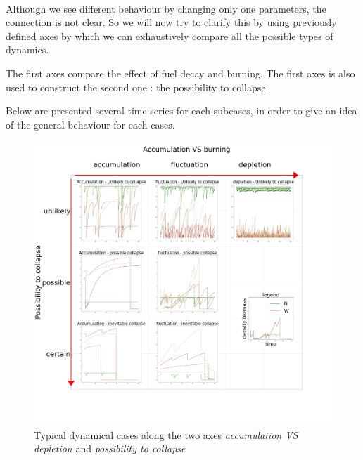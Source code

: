 \documentclass{article}
\begin{document}

\paragraph{}
Although we see different behaviour by changing only one parameters, the connection is not clear. So we will now try to clarify this by using \hyperref[axes_definition]{previously defined} axes by which we can exhaustively compare all the possible types of dynamics.
    
The first axes compare the effect of fuel decay and burning. The first axes is also used to construct the second one : the possibility to collapse.

Below are presented several time series for each subcases, in order to give an idea of the general behaviour for each cases.


\begin{figure}[h!]
\centering
\includegraphics[width=12cm]{results/time_series_each_cases.png}
\caption{Typical dynamical cases along the two axes \textit{accumulation VS depletion} and \textit{possibility to collapse}}
\end{figure}
\end{document}

